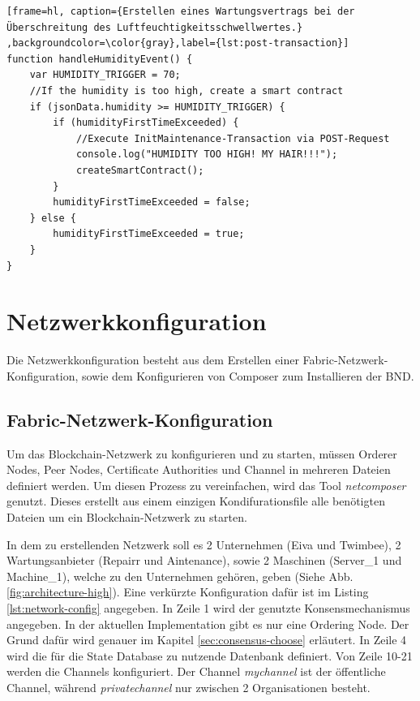 \begin{lstfloat}
\begin{lstlisting}[frame=hl, caption={Erstellen eines Wartungsvertrags bei der Überschreitung des Luftfeuchtigkeitsschwellwertes.} ,backgroundcolor=\color{gray},label={lst:post-transaction}]
function handleHumidityEvent() {
    var HUMIDITY_TRIGGER = 70;
    //If the humidity is too high, create a smart contract
    if (jsonData.humidity >= HUMIDITY_TRIGGER) {
        if (humidityFirstTimeExceeded) {
            //Execute InitMaintenance-Transaction via POST-Request
            console.log("HUMIDITY TOO HIGH! MY HAIR!!!");
            createSmartContract(); 
        }
        humidityFirstTimeExceeded = false;
    } else {
        humidityFirstTimeExceeded = true;
    }
}
\end{lstlisting} 
\end{lstfloat}

\section{Netzwerkkonfiguration}
\label{sec:network-config}
Die Netzwerkkonfiguration besteht aus dem Erstellen einer Fabric-Netzwerk-Konfiguration, sowie dem Konfigurieren von Composer zum Installieren der BND. 

\subsection{Fabric-Netzwerk-Konfiguration}
Um das Blockchain-Netzwerk zu konfigurieren und zu starten, müssen Orderer Nodes, Peer Nodes, Certificate Authorities und Channel in mehreren Dateien definiert werden. Um diesen Prozess zu vereinfachen, wird das Tool \textit{netcomposer} \cite{netcomposerGithubRepository2018} genutzt. Dieses erstellt aus einem einzigen Kondifurationsfile alle benötigten Dateien um ein Blockchain-Netzwerk zu starten. 

In dem zu erstellenden Netzwerk soll es 2 Unternehmen (Eiva und Twimbee), 2 Wartungsanbieter (Repairr und Aintenance), sowie 2 Maschinen (Server\_1 und Machine\_1), welche zu den Unternehmen gehören, geben (Siehe Abb. \ref{fig:architecture-high}). Eine verkürzte Konfiguration dafür ist im Listing \ref{lst:network-config} angegeben. In Zeile 1 wird der genutzte Konsensmechanismus angegeben. In der aktuellen Implementation gibt es nur eine Ordering Node. Der Grund dafür wird genauer im Kapitel \ref{sec:consensus-choose} erläutert. In Zeile 4 wird die für die State Database zu nutzende Datenbank definiert. Von Zeile 10-21 werden die Channels konfiguriert. Der Channel \textit{mychannel} ist der öffentliche Channel, während \textit{privatechannel} nur zwischen 2 Organisationen besteht. 

